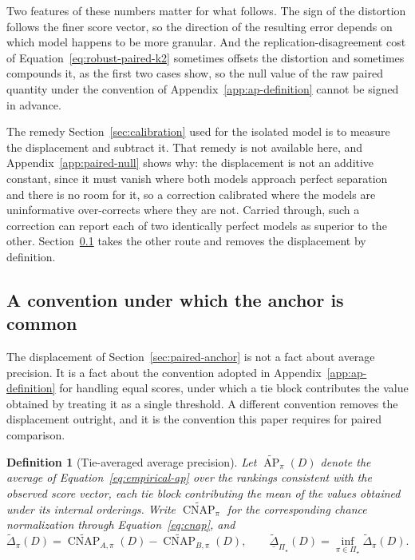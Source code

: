 \documentclass[11pt]{article}
\newcommand{\AP}{\operatorname{AP}}
\newcommand{\CNAP}{\operatorname{CNAP}}
\newcommand{\PSet}{\Pi_\star}
\newcommand{\APta}{\widetilde{\AP}}
\newcommand{\CNAPta}{\widetilde{\CNAP}}
\newcommand{\Dta}{\widetilde{\Delta}}
\newcommand{\RobDta}{\underline{\widetilde{\Delta}}_{\PSet}}
\newtheorem{definition}{Definition}
\theoremstyle{remark}
\begin{document}
Two features of these numbers matter for what follows. The sign of the distortion follows the finer score vector, so the direction of the resulting error depends on which model happens to be more granular. And the replication-disagreement cost of Equation~\eqref{eq:robust-paired-k2} sometimes offsets the distortion and sometimes compounds it, as the first two cases show, so the null value of the raw paired quantity under the convention of Appendix~\ref{app:ap-definition} cannot be signed in advance.

The remedy Section~\ref{sec:calibration} used for the isolated model is to measure the displacement and subtract it. That remedy is not available here, and Appendix~\ref{app:paired-null} shows why: the displacement is not an additive constant, since it must vanish where both models approach perfect separation and there is no room for it, so a correction calibrated where the models are uninformative over-corrects where they are not. Carried through, such a correction can report each of two identically perfect models as superior to the other. Section~\ref{sec:paired-convention} takes the other route and removes the displacement by definition.

\subsection{A convention under which the anchor is common}
\label{sec:paired-convention}

The displacement of Section~\ref{sec:paired-anchor} is not a fact about average precision. It is a fact about the convention adopted in Appendix~\ref{app:ap-definition} for handling equal scores, under which a tie block contributes the value obtained by treating it as a single threshold. A different convention removes the displacement outright, and it is the convention this paper requires for paired comparison.

\begin{definition}[Tie-averaged average precision]
Let $\APta_\pi(D)$ denote the average of Equation~\eqref{eq:empirical-ap} over the rankings consistent with the observed score vector, each tie block contributing the mean of the values obtained under its internal orderings. Write $\CNAPta_\pi$ for the corresponding chance normalization through Equation~\eqref{eq:cnap}, and
\[
\Dta_\pi(D)
=
\CNAPta_{A,\pi}(D)-\CNAPta_{B,\pi}(D),
\qquad
\RobDta(D)
=
\inf_{\pi\in\PSet}\Dta_\pi(D).
\]
\end{definition}
\end{document}
